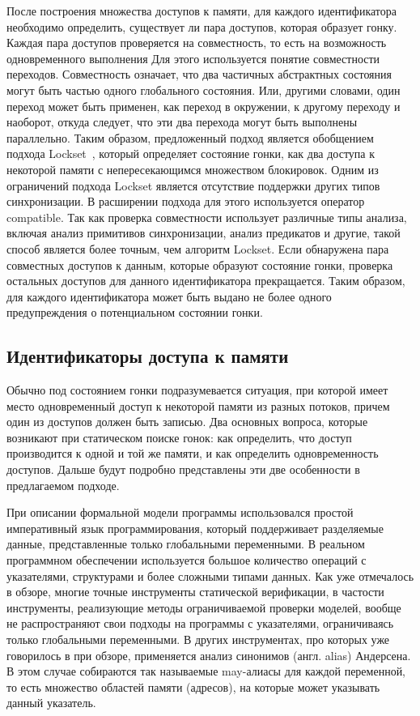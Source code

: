 После построения множества доступов к памяти, для каждого идентификатора необходимо определить, существует ли пара доступов, которая образует гонку.
Каждая пара доступов проверяется на совместность, то есть на возможность одновременного выполнения
Для этого используется понятие совместности переходов. Совместность означает, что два частичных абстрактных состояния могут быть частью одного глобального состояния.
Или, другими словами, один переход может быть применен, как переход в окружении, к другому переходу и наоборот, откуда следует, что эти два перехода могут быть выполнены параллельно.
Таким образом, предложенный подход является обобщением подхода Lockset~\cite{eraser97}, который определяет состояние гонки, как два доступа к некоторой памяти с непересекающимся множеством блокировок.
Одним из ограничений подхода Lockset является отсутствие поддержки других типов синхронизации.
В расширении подхода для этого используется оператор compatible. 
Так как проверка совместности использует различные типы анализа, включая анализ примитивов синхронизации, анализ предикатов и другие, такой способ является более точным, чем алгоритм Lockset.
Если обнаружена пара совместных доступов к данным, которые образуют состояние гонки, проверка остальных доступов для данного идентификатора прекращается.
Таким образом, для каждого идентификатора может быть выдано не более одного предупреждения о потенциальном состоянии гонки.

\subsection{Идентификаторы доступа к памяти}
\label{subsect_impl_identifiers}

Обычно под состоянием гонки подразумевается ситуация, при которой имеет место одновременный доступ к некоторой памяти из разных потоков, причем один из доступов должен быть записью.
Два основных вопроса, которые возникают при статическом поиске гонок: как определить, что доступ производится к одной и той же памяти, и как определить одновременность доступов.
Дальше будут подробно представлены эти две особенности в предлагаемом подходе.

При описании формальной модели программы использовался простой императивный язык программирования, который поддерживает разделяемые данные, представленные только глобальными переменными.
В реальном программном обеспечении используется большое количество операций с указателями, структурами и более сложными типами данных.
Как уже отмечалось в обзоре, многие точные инструменты статической верификации, в частости инструменты, реализующие методы ограничиваемой проверки моделей, вообще не распространяют свои подходы на программы с указателями, ограничиваясь только глобальными переменными.
В других инструментах, про которых уже говорилось в при обзоре, применяется анализ синонимов (англ. alias) Андерсена.
В этом случае собираются так называемые may-алиасы для каждой переменной, то есть множество областей памяти (адресов), на которые может указывать данный указатель.

